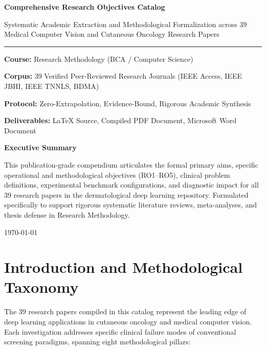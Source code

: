 \documentclass[10pt,a4paper]{article}
\begin{document}
\begin{titlepage}
    \centering
    \vspace*{1.5cm}
    {\Huge\bfseries\color{primaryblue} Comprehensive Research Objectives Catalog\par}
    \vspace{0.4cm}
    {\Large\color{accentblue} Systematic Academic Extraction and Methodological Formalization across 39 Medical Computer Vision and Cutaneous Oncology Research Papers\par}
    \vspace{1.2cm}
    \rule{\linewidth}{1.2pt}\par
    \vspace{0.8cm}
    {\large\textbf{Course:} Research Methodology (BCA / Computer Science)\par}
    \vspace{0.2cm}
    {\large\textbf{Corpus:} 39 Verified Peer-Reviewed Research Journals (IEEE Access, IEEE JBHI, IEEE TNNLS, BDMA)\par}
    \vspace{0.2cm}
    {\large\textbf{Protocol:} Zero-Extrapolation, Evidence-Bound, Rigorous Academic Synthesis\par}
    \vspace{0.2cm}
    {\large\textbf{Deliverables:} LaTeX Source, Compiled PDF Document, Microsoft Word Document\par}
    \vspace{1.5cm}
    \begin{tcolorbox}[colback=primaryblue!5!white,colframe=primaryblue,arc=3mm,width=0.92\linewidth]
        \centering
        \textbf{\large Executive Summary}\par
        \small
        This publication-grade compendium articulates the formal primary aims, specific operational and methodological objectives (RO1--RO5), clinical problem definitions, experimental benchmark configurations, and diagnostic impact for all 39 research papers in the dermatological deep learning repository. Formulated specifically to support rigorous systematic literature reviews, meta-analyses, and thesis defense in Research Methodology.
    \end{tcolorbox}
    \vfill
    {\large\today\par}
\end{titlepage}

\tableofcontents
\newpage

\section{Introduction and Methodological Taxonomy}
The 39 research papers compiled in this catalog represent the leading edge of deep learning applications in cutaneous oncology and medical computer vision. Each investigation addresses specific clinical failure modes of conventional screening paradigms, spanning eight methodological pillars:
\end{document}
